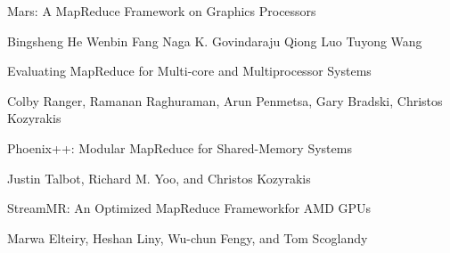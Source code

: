 \documentclass[11pt,a4paper,twocolumn] {scrartcl}   %
\begin{document}
\begin{thebibliography}{9}
  Mars: A MapReduce Framework on Graphics Processors

  Bingsheng He Wenbin Fang Naga K. Govindaraju Qiong Luo Tuyong Wang

  Evaluating MapReduce for Multi-core and Multiprocessor Systems

  Colby Ranger, Ramanan Raghuraman, Arun Penmetsa, Gary Bradski, Christos Kozyrakis

    Phoenix++: Modular MapReduce for Shared-Memory Systems

    Justin Talbot, Richard M. Yoo, and Christos Kozyrakis

    StreamMR: An Optimized MapReduce Frameworkfor AMD GPUs

    Marwa Elteiry, Heshan Liny, Wu-chun Fengy, and Tom Scoglandy

\thispagestyle{empty}
\pagestyle{empty}
\end{thebibliography}
\end{document}
